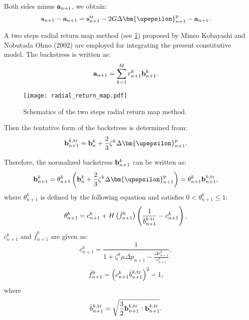 Both sides minus ${{\bf{a}}_{n + 1}}$, we obtain:
\begin{equation}
\label{Equ:sminusa1}
{{\bf{s}}_{n + 1}} - {{\bf{a}}_{n + 1}} = {\bf{s}}_{n + 1}^{\rm{tr}} - 2G\Delta {\bm{\upepsilon }}_{n + 1}^{\rm{p}} - {{\bf{a}}_{n + 1}}.
\end{equation}

A two steps radial return map method (see \ref{Fig:radial_return_map}) proposed by Mineo Kobayashi and Nobutada Ohno (2002) \cite{kobayashi2002implementation} are employed for integrating the present constitutive model. The backstress is written as:
\begin{equation}
{{\bf{a}}_{n + 1}} = \sum\limits_{k = 1}^M {r_{n + 1}^k{\bf{b}}_{n + 1}^k}.
\end{equation}
\begin{figure}[!htp]
	\centering
	\texttt{[image: radial\_return\_map.pdf]}
	\caption{Schematics of the two steps radial return map method.}
	\label{Fig:radial_return_map}
\end{figure}

Then the tentative form of the backstress is determined from:
\begin{equation}
\label{Equ:btrn+1}
{\bf{b}}_{n + 1}^{k,{\rm{tr}}} = {\bf{b}}_n^k + \frac{2}{3}{\zeta ^k}\Delta {\bm{\upepsilon }}_{n + 1}^{\rm{p}}.
\end{equation}

Therefore, the normalized backstress ${\bf{b}}_{n + 1}^k$ can be written as:
\begin{equation}
\label{Equ:bn+1}
{\bf{b}}_{n + 1}^k = \theta _{n + 1}^k\left( {{\bf{b}}_n^k + \frac{2}{3}{\zeta ^k}\Delta {\bm{\upepsilon }}_{n + 1}^{\rm{p}}} \right) = \theta _{n + 1}^k{\bf{b}}_{n + 1}^{k,{\rm{tr}}},
\end{equation}
where $\theta _{n + 1}^k$ is defined by the following equation and satisfies $0 < \theta _{n + 1}^k \leqslant 1$:
\begin{equation}
\label{Equ:thetan+1}
\theta _{n + 1}^k = c_{n + 1}^k + H\left( {\bar f_{n + 1}^k} \right)\left( {\frac{1}{{\bar b_{n + 1}^{k,{\rm{tr}}}}} - c_{n + 1}^k} \right),
\end{equation}
$c_{n + 1}^k$ and ${\bar f_{n + 1}^k}$ are given as:
\begin{equation}
c_{n + 1}^k = \frac{1}{{1 + {\zeta ^k}\mu \Delta {p_{n + 1}} - \frac{{\Delta r_{n + 1}^k}}{{r_{n + 1}^k}}}},
\end{equation}
\begin{equation}
\bar f_{n + 1}^k = {\left( {c_{n + 1}^k\bar b_{n + 1}^{k,{\rm{tr}}}} \right)^2} - 1,
\end{equation}
where
\begin{equation}
\bar b_{n + 1}^{k,{\rm{tr}}} = \sqrt {\frac{3}{2}{\bf{b}}_{n + 1}^{k,{\rm{tr}}}:{\bf{b}}_{n + 1}^{k,{\rm{tr}}}}.
\end{equation}

